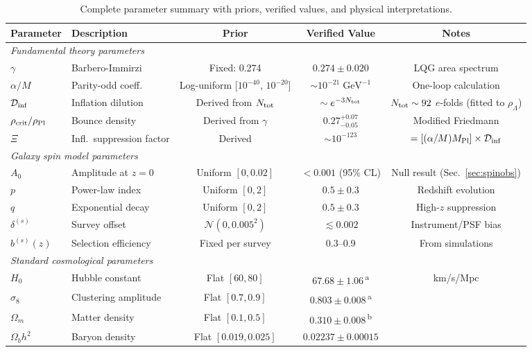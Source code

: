 \documentclass[aps,prd,twocolumn,superscriptaddress,showpacs,preprintnumbers,nofootinbib,longbibliography,floatfix]{revtex4-2}
\newcommand{\Dinf}{\mathcal{D}_{\rm inf}}
\newcommand{\rhocrit}{\rho_{\rm crit}}
\newcommand{\rhoPl}{\rho_{\rm Pl}}
\newcommand{\MPl}{M_{\rm Pl}}
\begin{document}
\begin{table}[t]
\caption{\label{tab:params}\label{tab:priors} Complete parameter summary with priors, verified values, and physical interpretations.}
\begin{ruledtabular}
\begin{tabular}{llccc}
Parameter & Description & Prior & Verified Value & Notes \\
\hline
\multicolumn{5}{l}{\textit{Fundamental theory parameters}} \\
$\gamma$ & Barbero-Immirzi & Fixed: 0.274 & $0.274\pm 0.020$ & LQG area spectrum \\
$\alpha/M$ & Parity-odd coeff. & Log-uniform [$10^{-40}$, $10^{-20}$] & $\sim 10^{-21}\;\text{GeV}^{-1}$ & One-loop calculation \\
$\Dinf$ & Inflation dilution & Derived from $N_{\rm tot}$ & $\sim e^{-3N_{\rm tot}}$ & $N_{\rm tot}\sim 92$ $e$-folds (fitted to $\rho_\Lambda$) \\
$\rhocrit/\rhoPl$ & Bounce density & Derived from $\gamma$ & $0.27^{+0.07}_{-0.05}$ & Modified Friedmann \\
$\Xi$ & Infl.\ suppression factor & Derived & $\sim 10^{-123}$ & $= [(\alpha/M)\MPl]\times\Dinf$ \\
\hline
\multicolumn{5}{l}{\textit{Galaxy spin model parameters}} \\
$A_0$ & Amplitude at $z=0$ & Uniform $[0,0.02]$ & $< 0.001$ (95\% CL) & Null result (Sec.~\ref{sec:spinobs}) \\
$p$ & Power-law index & Uniform $[0,2]$ & $0.5\pm 0.3$ & Redshift evolution \\
$q$ & Exponential decay & Uniform $[0,2]$ & $0.5\pm 0.3$ & High-$z$ suppression \\
$\delta^{(s)}$ & Survey offset & $\mathcal{N}(0,0.005^2)$ & $\lesssim 0.002$ & Instrument/PSF bias \\
$b^{(s)}(z)$ & Selection efficiency & Fixed per survey & 0.3--0.9 & From simulations \\
\hline
\multicolumn{5}{l}{\textit{Standard cosmological parameters}} \\
$H_0$ & Hubble constant & Flat $[60,80]$ & $67.68\pm 1.06$\,\textsuperscript{a} & km/s/Mpc \\
$\sigma_8$ & Clustering amplitude & Flat $[0.7,0.9]$ & $0.803\pm 0.008$\,\textsuperscript{a} & \\
$\Omega_m$ & Matter density & Flat $[0.1,0.5]$ & $0.310 \pm 0.008$\,\textsuperscript{b} & \\
$\Omega_b h^2$ & Baryon density & Flat $[0.019,0.025]$ & $0.02237 \pm 0.00015$ & \\

\end{tabular}
\end{ruledtabular}
\end{table}
\end{document}
